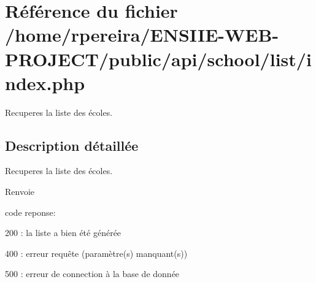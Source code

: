 \hypertarget{school_2list_2index_8php}{}\section{Référence du fichier /home/rpereira/\+E\+N\+S\+I\+I\+E-\/\+W\+E\+B-\/\+P\+R\+O\+J\+E\+C\+T/public/api/school/list/index.php}
\label{school_2list_2index_8php}


Recuperes la liste des écoles.  




\subsection{Description détaillée}
Recuperes la liste des écoles. 

\begin{DoxyReturn}{Renvoie}

\begin{DoxyItemize}
\item code reponse\+:
\begin{DoxyItemize}
\item 200 \+: la liste a bien été générée
\item 400 \+: erreur requête (paramètre(s) manquant(s))
\item 500 \+: erreur de connection à la base de donnée 
\end{DoxyItemize}
\end{DoxyItemize}
\end{DoxyReturn}
